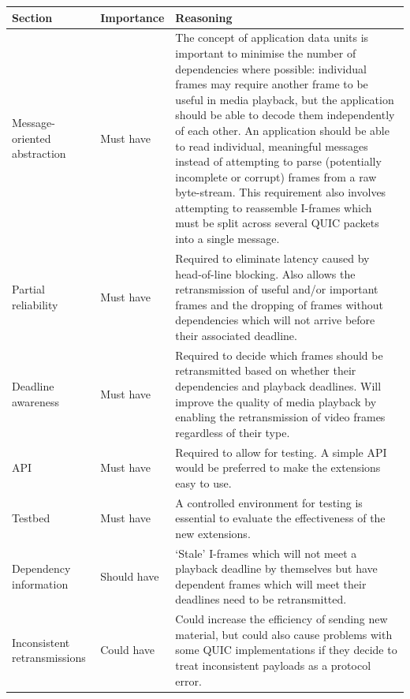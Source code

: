 \documentclass{mprop}
\begin{document}
\begin{longtable}{|p{3.5cm}|l|p{8.5cm}|}
\toprule 
Section & Importance & Reasoning \\

\midrule

Message-oriented abstraction  & Must have & The concept of application data units is important to minimise the number of dependencies where possible: individual frames may require another frame to be useful in media playback, but the application should be able to decode them independently of each other. An application should be able to read individual, meaningful messages instead of attempting to parse (potentially incomplete or corrupt) frames from a raw byte-stream. This requirement also involves attempting to reassemble I-frames which must be split across several QUIC packets into a single message. 

\\ 
Partial reliability & Must have & Required to eliminate latency caused by head-of-line blocking. Also allows the retransmission of useful and/or important frames and the dropping of frames without dependencies which will not arrive before their associated deadline. 

\\ 
Deadline awareness & Must have & Required to decide which frames should be retransmitted based on whether their dependencies and playback deadlines. Will improve the quality of media playback by enabling the retransmission of video frames regardless of their type. 

\\ 
API & Must have & Required to allow for testing. A simple API would be preferred to make the extensions easy to use. 

\\ 
Testbed & Must have & A controlled environment for testing is essential to evaluate the effectiveness of the new extensions. 

\\
Dependency information & Should have & `Stale' I-frames which will not meet a playback deadline by themselves but have dependent frames which will meet their deadlines need to be retransmitted. 

\\  
Inconsistent retransmissions & Could have & Could increase the efficiency of sending new material, but could also cause problems with some QUIC implementations if they decide to treat inconsistent payloads as a protocol error. 


\end{longtable}
\end{document}
